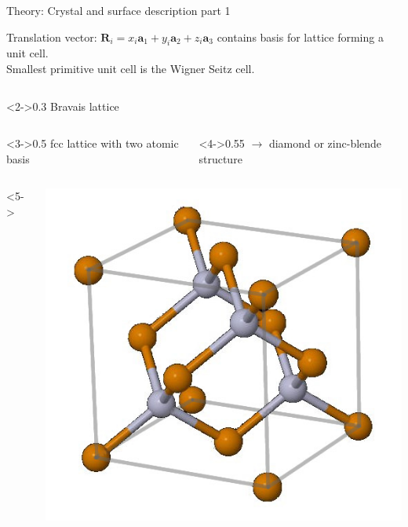 \begin{frame}{Theory: Crystal and surface description part 1}

	\begin{block}{Translation vector: $\boldsymbol{R}_i = x_i \boldsymbol{a}_1 + y_i \boldsymbol{a}_2 + z_i \boldsymbol{a}_3$}
		contains basis for lattice forming a unit cell. \\
		Smallest primitive unit cell is the Wigner Seitz cell.
	\end{block}
	\begin{columns}
		\begin{column}<2->{0.3\linewidth}
			Bravais lattice  
		\end{column}
	\end{columns}
	\begin{columns}
		\begin{column}<3->{0.5\linewidth}
			fcc lattice with two atomic basis 
		\end{column}
		\hspace{-1cm}
		\begin{column}<4->{0.55\linewidth}
			$\rightarrow$ diamond or zinc-blende structure 
		\end{column}
	\end{columns}
	\hfill
	\begin{columns}<5->
		\begin{column}{.25\linewidth}
			\centering
			\includegraphics[width=\linewidth]{andere_bilder/zinc_blende}

\end{column}
\end{columns}
\end{frame}
